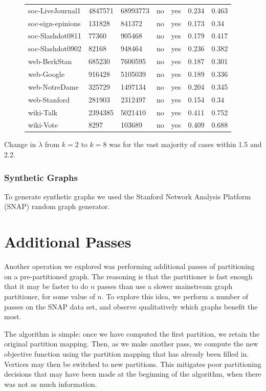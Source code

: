 \documentclass[11pt]{article}
\begin{document}
\begin{figure}
{\begin{tabular}{ *7l }
soc-LiveJournal1 & 4847571 & 68993773 & no & yes &0.234& 0.463\\ 
soc-sign-epinions & 131828 & 841372 & no & yes &0.173&0.34\\ 
soc-Slashdot0811 & 77360 & 905468 & no & yes &0.179&0.417\\ 
soc-Slashdot0902 & 82168 & 948464 & no & yes &0.236&0.382\\ 
web-BerkStan & 685230 & 7600595 & no & yes &0.187&0.301\\ 
web-Google & 916428 & 5105039 & no & yes &0.189&0.336\\ 
web-NotreDame & 325729 & 1497134 & no & yes &0.204&0.345\\ 
web-Stanford & 281903 & 2312497 & no & yes &0.154&0.34\\ 
wiki-Talk & 2394385 & 5021410 & no & yes &0.411&0.752\\ 
wiki-Vote  & 8297 & 103689 & no & yes &0.409&0.688\\ 
 \hline
\end{tabular}\par
}
\end{figure}

Change in $\lambda$ from $k=2$ to $k=8$ was for the vast majority of cases within 1.5 and 2.2.

\subsubsection{Synthetic Graphs}
To generate synthetic graphs we used the Stanford Network Analysis Platform (SNAP) random graph generator.

\section{Additional Passes}
Another operation we explored was performing additional passes of partitioning on a pre-partitioned graph. The reasoning is that the partitioner is fast enough that it may be faster to do $n$ passes than use a slower mainstream graph partitioner, for some value of $n$. To explore this idea, we perform a number of passes on the SNAP data set, and observe qualitatively which graphs benefit the most. 

The algorithm is simple: once we have computed the first partition, we retain the original partition mapping. Then, as we make another pass, we compute the new objective function using the partition mapping that has already been filled in. Vertices may then be switched to new partitions. This mitigates poor partitioning decisions that may have been made at the beginning of the algorithm, when there was not as much information. 
\end{document}
